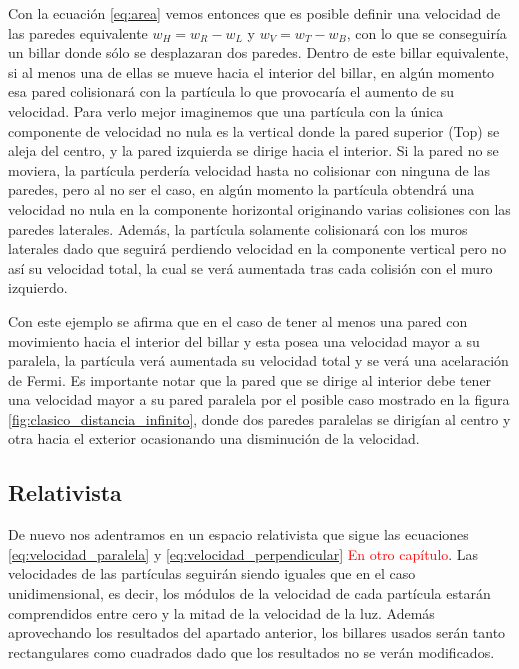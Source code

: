 Con la ecuación \ref{eq:area} vemos entonces que es posible definir una velocidad de las paredes equivalente \( w_H =  w_R - w_L \) y \( w_V = w_T - w_B \), con lo que se conseguiría un billar donde sólo se desplazaran dos paredes. Dentro de este billar equivalente, si al menos una de ellas se mueve hacia el interior del billar, en algún momento esa pared colisionará con la partícula lo que provocaría el aumento de su velocidad. Para verlo mejor imaginemos que una partícula con la única componente de velocidad no nula es la vertical donde la pared superior (Top) se aleja del centro, y la pared izquierda se dirige hacia el interior. Si la pared no se moviera, la partícula perdería velocidad hasta no colisionar con ninguna de las paredes, pero al no ser el caso, en algún momento la partícula obtendrá una velocidad no nula en la componente horizontal originando varias colisiones con las paredes laterales. Además, la partícula solamente colisionará con los muros laterales dado que seguirá perdiendo velocidad en la componente vertical pero no así su velocidad total, la cual se verá aumentada tras cada colisión con el muro izquierdo.

\vspace{3mm}

Con este ejemplo se afirma que en el caso de tener al menos una pared con movimiento hacia el interior del billar y esta posea una velocidad mayor a su paralela, la partícula verá aumentada su velocidad total y se verá una acelaración de Fermi. Es importante notar que la pared que se dirige al interior debe tener una velocidad mayor a su pared paralela por el posible caso mostrado en la figura \ref{fig:clasico_distancia_infinito}, donde dos paredes paralelas se dirigían al centro y otra hacia el exterior ocasionando una disminución de la velocidad.

\subsection{Relativista}

De nuevo nos adentramos en un espacio relativista que sigue las ecuaciones \ref{eq:velocidad_paralela} y \ref{eq:velocidad_perpendicular} \textcolor{red}{En otro capítulo}. Las velocidades de las partículas seguirán siendo iguales que en el caso unidimensional, es decir, los módulos de la velocidad de cada partícula estarán comprendidos entre cero y la mitad de la velocidad de la luz. Además aprovechando los resultados del apartado anterior, los billares usados serán tanto rectangulares como cuadrados dado que los resultados no se verán modificados.


